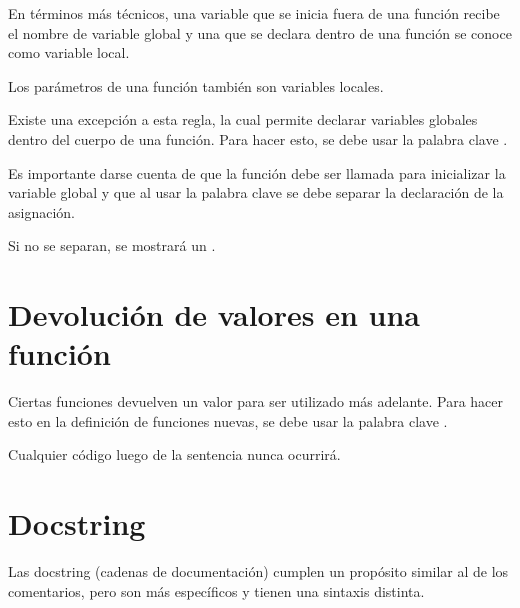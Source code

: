 
En términos más técnicos, una variable que se inicia fuera de una función recibe el nombre de variable global y una que se declara dentro de una función se conoce como variable local.


Los parámetros de una función también son variables locales.

Existe una excepción a esta regla, la cual permite declarar variables globales dentro del cuerpo de una función.
Para hacer esto, se debe usar la palabra clave .


Es importante darse cuenta de que la función  debe ser llamada para inicializar la variable global  y que al usar la palabra clave  se debe separar la declaración de la asignación.

Si no se separan, se mostrará un .


\section{Devolución de valores en una función}

Ciertas funciones devuelven un valor para ser utilizado más adelante.
Para hacer esto en la definición de funciones nuevas, se debe usar la palabra clave .


Cualquier código luego de la sentencia  nunca ocurrirá.


\section{Docstring}

Las docstring (cadenas de documentación) cumplen un propósito similar al de los comentarios, pero son más específicos y tienen una sintaxis distinta.

